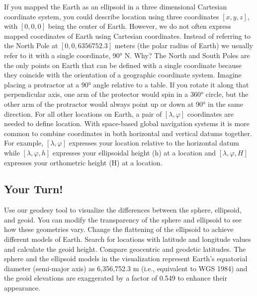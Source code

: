 \documentclass[
]{book}
\begin{document}
If you mapped the Earth as an ellipsoid in a three dimensional Cartesian coordinate system, you could describe location using three coordinates \([x,y,z]\), with \([0,0,0]\) being the center of Earth. However, we do not often express mapped coordinates of Earth using Cartesian coordinates. Instead of referring to the North Pole at \([0,0,6356752.3]\) meters (the polar radius of Earth) we usually refer to it with a single coordinate, 90° N. Why? The North and South Poles are the only points on Earth that can be defined with a single coordinate because they coincide with the orientation of a geographic coordinate system. Imagine placing a protractor at a 90° angle relative to a table. If you rotate it along that perpendicular axis, one arm of the protector would spin in a 360° circle, but the other arm of the protractor would always point up or down at 90° in the same direction. For all other locations on Earth, a pair of \([λ,φ]\) coordinates are needed to define location. With space-based global navigation systems it is more common to combine coordinates in both horizontal and vertical datums together. For example, \([λ,φ]\) expresses your location relative to the horizontal datum while \([λ,φ,h]\) expresses your ellipsoidal height (h) at a location and \([λ,φ,H]\) expresses your orthometric height (H) at a location.

\subsection*{Your Turn!}\label{your-turn}

Use our geodesy tool to visualize the differences between the sphere, ellipsoid, and geoid. You can modify the transparency of the sphere and ellipsoid to see how these geometries vary. Change the flattening of the ellipsoid to achieve different models of Earth. Search for locations with latitude and longitude values and calculate the geoid height. Compare geocentric and geodetic latitudes. The sphere and the ellipsoid models in the visualization represent Earth's equatorial diameter (semi-major axis) as 6,356,752.3 m (i.e., equivalent to WGS 1984) and the geoid elevations are exaggerated by a factor of 0.549 to enhance their appearance.
\end{document}
